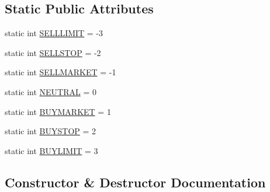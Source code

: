 \subsection*{Static Public Attributes}
\begin{DoxyCompactItemize}
\item 
static int \hyperlink{class_m_q_l4_c_sharp_1_1_base_1_1_common_1_1_signal_result_a5d33520303a9a4b3e31f667c9c6b9051}{S\+E\+L\+L\+L\+I\+M\+IT} = -\/3
\item 
static int \hyperlink{class_m_q_l4_c_sharp_1_1_base_1_1_common_1_1_signal_result_a5c3231b6d6c10f0a67045d57e9dd47a8}{S\+E\+L\+L\+S\+T\+OP} = -\/2
\item 
static int \hyperlink{class_m_q_l4_c_sharp_1_1_base_1_1_common_1_1_signal_result_a4db9d51186d5d076989d819b4066ae49}{S\+E\+L\+L\+M\+A\+R\+K\+ET} = -\/1
\item 
static int \hyperlink{class_m_q_l4_c_sharp_1_1_base_1_1_common_1_1_signal_result_a5d0b15ca9065a13a44b4cdcf0db3deb6}{N\+E\+U\+T\+R\+AL} = 0
\item 
static int \hyperlink{class_m_q_l4_c_sharp_1_1_base_1_1_common_1_1_signal_result_a51d5a8363939199395487cc8970c6c66}{B\+U\+Y\+M\+A\+R\+K\+ET} = 1
\item 
static int \hyperlink{class_m_q_l4_c_sharp_1_1_base_1_1_common_1_1_signal_result_a8d56e18ee897ae00939c0f34bfe58193}{B\+U\+Y\+S\+T\+OP} = 2
\item 
static int \hyperlink{class_m_q_l4_c_sharp_1_1_base_1_1_common_1_1_signal_result_a6efa692edc1be0e1020836ef2e427dfc}{B\+U\+Y\+L\+I\+M\+IT} = 3
\end{DoxyCompactItemize}


\subsection{Constructor \& Destructor Documentation}
